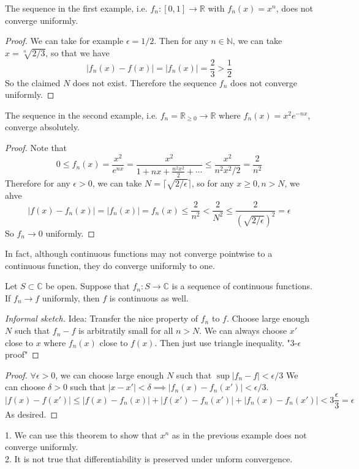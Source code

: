 \begin{proposition}
    The sequence in the first example, i.e. $f_n:[0,1]\to\mathbb R$ with $f_n(x)=x^n$, does not converge uniformly.
\end{proposition}
\begin{proof}
    We can take for example $\epsilon=1/2$. Then for any $n\in\mathbb N$, we can take $x=\sqrt[n]{2/3}$, so that we have
    $$|f_n(x)-f(x)|=|f_n(x)|=\frac{2}{3}>\frac{1}{2}$$
    So the claimed $N$ does not exist.
    Therefore the sequence $f_n$ does not converge uniformly.
\end{proof}
\begin{proposition}
    The sequence in the second example, i.e. $f_n=\mathbb R_{\ge 0}\to\mathbb R$ where $f_n(x)=x^2e^{-nx}$, converge absolutely.
\end{proposition}
\begin{proof}
    Note that
    $$0\le f_n(x)=\frac{x^2}{e^{nx}}=\frac{x^2}{1+nx+\frac{n^2x^2}{2}+\cdots}\le\frac{x^2}{n^2x^2/2}=\frac{2}{n^2}$$
    Therefore for any $\epsilon>0$, we can take $N=\lceil\sqrt{2/\epsilon}\rceil$, so for any $x\ge 0, n>N$, we ahve
    $$|f(x)-f_n(x)|=|f_n(x)|=f_n(x)\le\frac{2}{n^2}<\frac{2}{N^2}\le\frac{2}{(\sqrt{2/\epsilon})^2}=\epsilon$$
    So $f_n\to 0$ uniformly.
\end{proof}
In fact, although continuous functions may not converge pointwise to a continuous function, they do converge uniformly to one.
\begin{theorem}
    Let $S\subset\mathbb C$ be open.
    Suppose that $f_n:S\to\mathbb C$ is a sequence of continuous functions.
    If $f_n\to f$ uniformly, then $f$ is continuous as well.
\end{theorem}
\begin{proof}[Informal sketch]
    Idea: Transfer the nice property of $f_n$ to $f$.
    Choose large enough $N$ such that $f_n-f$ is arbitratily small for all $n>N$.
    We can always choose $x'$ close to $x$ where $f_n(x)$ close to $f(x)$.
    Then just use triangle inequality.
    "3-$\epsilon$ proof"
\end{proof}
\begin{proof}
    $\forall\epsilon>0$, we can choose large enough $N$ such that $\sup|f_n-f|<\epsilon/3$
    We can choose $\delta>0$ such that $|x-x'|<\delta\implies |f_n(x)-f_n(x')|<\epsilon/3$.
    $$|f(x)-f(x')|\le |f(x)-f_n(x)|+|f(x')-f_n(x')|+|f_n(x)-f_n(x')|<3\frac{\epsilon}{3}=\epsilon$$
    As desired.
\end{proof}
\begin{remark}
    1. We can use this theorem to show that $x^n$ as in the previous example does not converge uniformly.\\
    2. It is not true that differentiability is preserved under unform convergence.
\end{remark}
